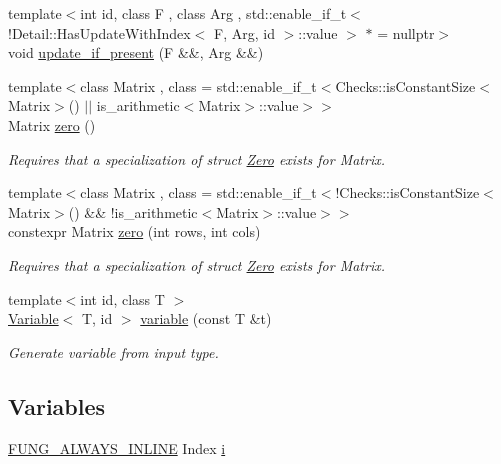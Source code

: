 \begin{DoxyCompactItemize}
\item 
{\footnotesize template$<$int id, class F , class Arg , std\-::enable\-\_\-if\-\_\-t$<$!\-Detail\-::\-Has\-Update\-With\-Index$<$ F, Arg, id $>$\-::value $>$ $\ast$  = nullptr$>$ }\\void \hyperlink{namespaceFunG_aed5ddbef97c98202e818bca2b74c75d2}{update\-\_\-if\-\_\-present} (\-F \&\&, \-Arg \&\&)
\item 
{\footnotesize template$<$class Matrix , class  = std\-::enable\-\_\-if\-\_\-t$<$\-Checks\-::is\-Constant\-Size$<$\-Matrix$>$() $|$$|$ is\-\_\-arithmetic$<$\-Matrix$>$\-::value$>$$>$ }\\\-Matrix \hyperlink{namespaceFunG_a649b4470d6def401959bfea3a368c48c}{zero} ()
\begin{DoxyCompactList}\small\item\em \-Requires that a specialization of struct \hyperlink{structFunG_1_1Zero}{\-Zero} exists for \-Matrix. \end{DoxyCompactList}\item 
{\footnotesize template$<$class Matrix , class  = std\-::enable\-\_\-if\-\_\-t$<$!\-Checks\-::is\-Constant\-Size$<$\-Matrix$>$() \&\& !is\-\_\-arithmetic$<$\-Matrix$>$\-::value$>$$>$ }\\constexpr \-Matrix \hyperlink{namespaceFunG_ae633433339ba30207aa526e54e3924b4}{zero} (int rows, int cols)
\begin{DoxyCompactList}\small\item\em \-Requires that a specialization of struct \hyperlink{structFunG_1_1Zero}{\-Zero} exists for \-Matrix. \end{DoxyCompactList}\item 
{\footnotesize template$<$int id, class T $>$ }\\\hyperlink{structFunG_1_1Variable}{\-Variable}$<$ \-T, id $>$ \hyperlink{namespaceFunG_a1c474456411f028e14eab67ff6eebe0c}{variable} (const \-T \&t)
\begin{DoxyCompactList}\small\item\em \-Generate variable from input type. \end{DoxyCompactList}\end{DoxyCompactItemize}
\subsection*{\-Variables}
\begin{DoxyCompactItemize}
\item 
\hyperlink{macros_8hh_a03b9da186125795e5afa49d0ef1cc32f}{\-F\-U\-N\-G\-\_\-\-A\-L\-W\-A\-Y\-S\-\_\-\-I\-N\-L\-I\-N\-E} \-Index \hyperlink{namespaceFunG_a596429cd53658fe4796a76dd39d6a8da}{i}
\end{DoxyCompactItemize}


